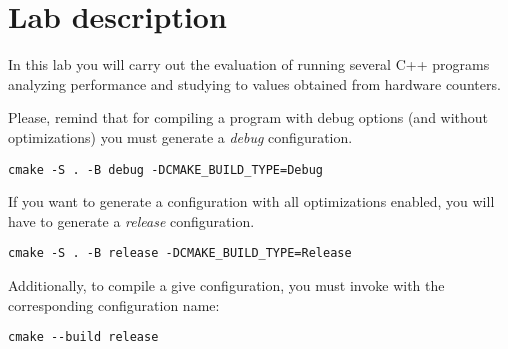 \section{Lab description}

In this lab you will carry out the evaluation of running several
C++ programs analyzing performance and studying to values obtained
from hardware counters.

Please, remind that for compiling a program with debug options
(and without optimizations) you must generate a \emph{debug} configuration.

\begin{lstlisting}[style=terminal,aboveskip=1em,belowskip=1em]
cmake -S . -B debug -DCMAKE_BUILD_TYPE=Debug
\end{lstlisting}

If you want to generate a configuration with all optimizations
enabled, you will have to generate a \emph{release} configuration.

\begin{lstlisting}[style=terminal,aboveskip=1em,belowskip=1em]
cmake -S . -B release -DCMAKE_BUILD_TYPE=Release
\end{lstlisting}

Additionally, to compile a give configuration, you must invoke 
with the corresponding configuration name:

\begin{lstlisting}[style=terminal,aboveskip=1em,belowskip=1em]
cmake --build release
\end{lstlisting}

